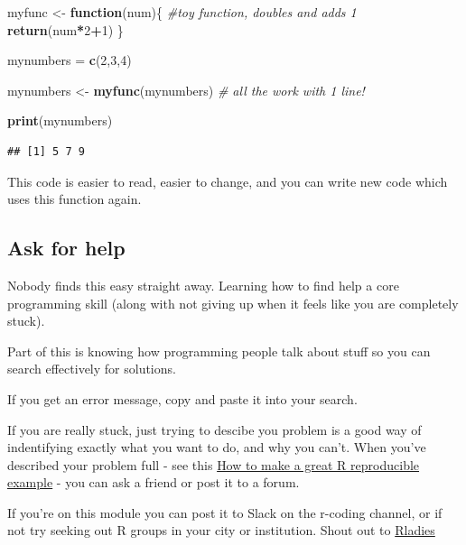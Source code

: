 \documentclass[]{book}
\newenvironment{Shaded}{\begin{snugshade}}{\end{snugshade}}
\newcommand{\KeywordTok}[1]{\textcolor[rgb]{0.13,0.29,0.53}{\textbf{#1}}}
\newcommand{\DecValTok}[1]{\textcolor[rgb]{0.00,0.00,0.81}{#1}}
\newcommand{\StringTok}[1]{\textcolor[rgb]{0.31,0.60,0.02}{#1}}
\newcommand{\CommentTok}[1]{\textcolor[rgb]{0.56,0.35,0.01}{\textit{#1}}}
\newcommand{\ControlFlowTok}[1]{\textcolor[rgb]{0.13,0.29,0.53}{\textbf{#1}}}
\newcommand{\OperatorTok}[1]{\textcolor[rgb]{0.81,0.36,0.00}{\textbf{#1}}}
\newcommand{\NormalTok}[1]{#1}
\begin{document}
\begin{Shaded}
\begin{Highlighting}[]
\NormalTok{myfunc <-}\StringTok{ }\ControlFlowTok{function}\NormalTok{(num)\{}
  \CommentTok{#toy function, doubles and adds 1}
  \KeywordTok{return}\NormalTok{(num}\OperatorTok{*}\DecValTok{2}\OperatorTok{+}\DecValTok{1}\NormalTok{)}
\NormalTok{  \}  }

\NormalTok{mynumbers =}\StringTok{ }\KeywordTok{c}\NormalTok{(}\DecValTok{2}\NormalTok{,}\DecValTok{3}\NormalTok{,}\DecValTok{4}\NormalTok{)}

\NormalTok{mynumbers <-}\StringTok{ }\KeywordTok{myfunc}\NormalTok{(mynumbers) }\CommentTok{# all the work with 1 line!}

\KeywordTok{print}\NormalTok{(mynumbers)}
\end{Highlighting}
\end{Shaded}

\begin{verbatim}
## [1] 5 7 9
\end{verbatim}

This code is easier to read, easier to change, and you can write new
code which uses this function again.

\subsection{Ask for help}\label{ask-for-help}

Nobody finds this easy straight away. Learning how to find help a core
programming skill (along with not giving up when it feels like you are
completely stuck).

Part of this is knowing how programming people talk about stuff so you
can search effectively for solutions.

If you get an error message, copy and paste it into your search.

If you are really stuck, just trying to descibe you problem is a good
way of indentifying exactly what you want to do, and why you can't. When
you've described your problem full - see this
\href{https://stackoverflow.com/questions/5963269/how-to-make-a-great-r-reproducible-example}{How
to make a great R reproducible example} - you can ask a friend or post
it to a forum.

If you're on this module you can post it to Slack on the r-coding
channel, or if not try seeking out R groups in your city or institution.
Shout out to \href{https://rladies.org/}{Rladies}
\end{document}
